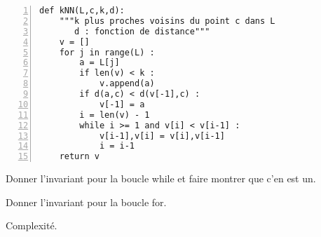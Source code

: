 \begin{Verbatim}[gobble=0,numbers=left]
def kNN(L,c,k,d):
    """k plus proches voisins du point c dans L
       d : fonction de distance"""
    v = []
    for j in range(L) :
        a = L[j]
        if len(v) < k : 
            v.append(a)
        if d(a,c) < d(v[-1],c) : 
            v[-1] = a
        i = len(v) - 1 
        while i >= 1 and v[i] < v[i-1] : 
            v[i-1],v[i] = v[i],v[i-1]
            i = i-1
    return v
\end{Verbatim}

\medskip

\question\ Donner l'invariant pour la boucle while et faire montrer que c'en est un. 

\medskip

\question\ Donner l'invariant pour la boucle for. 

\medskip

\question\ Complexité. 